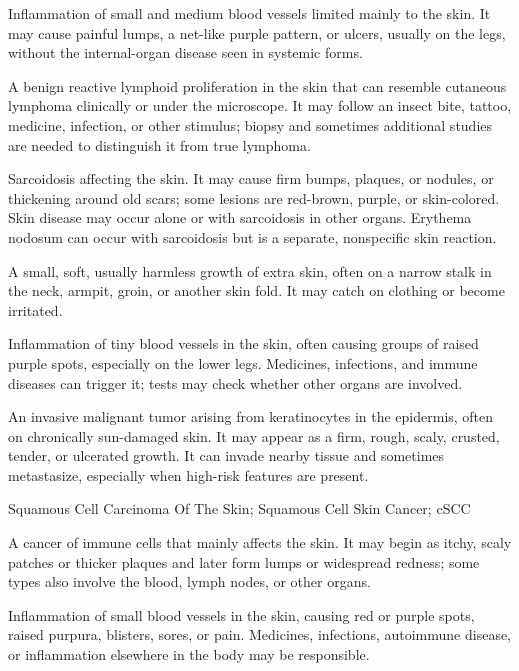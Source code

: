  Inflammation of small and medium blood vessels limited mainly to the skin. It may cause painful lumps, a net-like purple pattern, or ulcers, usually on the legs, without the internal-organ disease seen in systemic forms.

 A benign reactive lymphoid proliferation in the skin that can resemble cutaneous lymphoma clinically or under the microscope. It may follow an insect bite, tattoo, medicine, infection, or other stimulus; biopsy and sometimes additional studies are needed to distinguish it from true lymphoma.

 Sarcoidosis affecting the skin. It may cause firm bumps, plaques, or nodules, or thickening around old scars; some lesions are red-brown, purple, or skin-colored. Skin disease may occur alone or with sarcoidosis in other organs. Erythema nodosum can occur with sarcoidosis but is a separate, nonspecific skin reaction.

 A small, soft, usually harmless growth of extra skin, often on a narrow stalk in the neck, armpit, groin, or another skin fold. It may catch on clothing or become irritated.

 Inflammation of tiny blood vessels in the skin, often causing groups of raised purple spots, especially on the lower legs. Medicines, infections, and immune diseases can trigger it; tests may check whether other organs are involved.

 An invasive malignant tumor arising from keratinocytes in the epidermis, often on chronically sun-damaged skin. It may appear as a firm, rough, scaly, crusted, tender, or ulcerated growth. It can invade nearby tissue and sometimes metastasize, especially when high-risk features are present.

\synonyms
Squamous Cell Carcinoma Of The Skin; Squamous Cell Skin Cancer; cSCC

 A cancer of immune cells that mainly affects the skin. It may begin as itchy, scaly patches or thicker plaques and later form lumps or widespread redness; some types also involve the blood, lymph nodes, or other organs.

 Inflammation of small blood vessels in the skin, causing red or purple spots, raised purpura, blisters, sores, or pain. Medicines, infections, autoimmune disease, or inflammation elsewhere in the body may be responsible.

